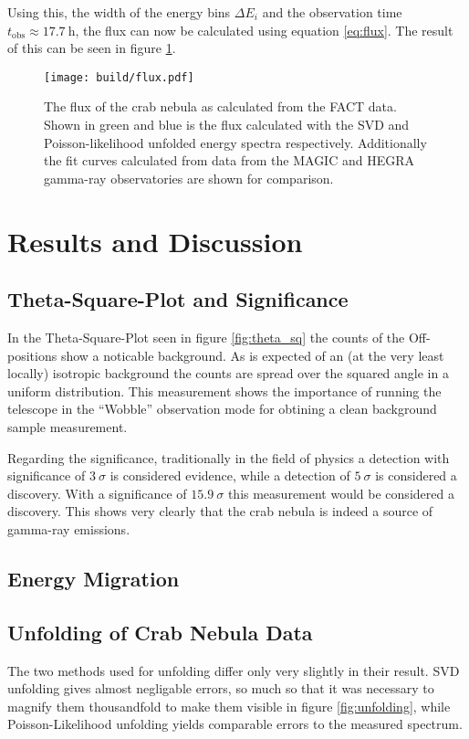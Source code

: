             Using this, the width of the energy bins $\Delta E_i$ and the observation time $t_\text{obs} \approx \SI{17.7}{\hour}$, the flux can now be calculated using equation \eqref{eq:flux}.
            The result of this can be seen in figure \ref{fig:flux}.
            \begin{figure}
                \centering
                \texttt{[image: build/flux.pdf]}
                \caption{
                    The flux of the crab nebula as calculated from the FACT data.
                    Shown in green and blue is the flux calculated with the SVD and Poisson-likelihood unfolded energy spectra respectively.
                    Additionally the fit curves calculated from data from the MAGIC\cite{MAGIC} and HEGRA\cite{HEGRA} gamma-ray observatories are shown for comparison.
                }
                \label{fig:flux}
            \end{figure}


%
%
    \section{Results and Discussion}
        \subsection{Theta-Square-Plot and Significance}
            In the Theta-Square-Plot seen in figure \ref{fig:theta_sq} the counts of the Off-positions show a noticable background.
            As is expected of an (at the very least locally) isotropic background the counts are spread over the squared angle in a uniform distribution.
            This measurement shows the importance of running the telescope in the \enquote{Wobble} observation mode for obtining a clean background sample measurement.

            Regarding the significance, traditionally in the field of physics a detection with significance of $3\:\sigma$ is considered evidence, while a detection of $5\:\sigma$ is considered a discovery.
            With a significance of $\num{15.9}\:\sigma$ this measurement would be considered a discovery.
            This shows very clearly that the crab nebula is indeed a source of gamma-ray emissions.

        \subsection{Energy Migration}
        \subsection{Unfolding of Crab Nebula Data}
            The two methods used for unfolding differ only very slightly in their result.
            SVD unfolding gives almost negligable errors, so much so that it was necessary to magnify them thousandfold to make them visible in figure \ref{fig:unfolding}, while Poisson-Likelihood unfolding yields comparable errors to the measured spectrum.
            
